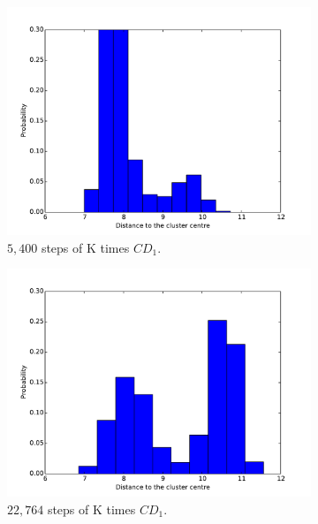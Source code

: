 \begin{figure}[hbt]
\begin{subfigure}[t]{0.18\textwidth}
			\includegraphics[width=\textwidth]{pics_sdbn/kcd_900.pdf}
		    \caption{$5,400$ steps of K times $CD_1$.}
		\end{subfigure}
		\begin{subfigure}[t]{0.18\textwidth}
			\includegraphics[width=\textwidth]{pics_sdbn/kcd_3794.pdf}
		    \caption{$ 22,764 $ steps of K times $CD_1$.}
		\end{subfigure}
		\begin{subfigure}[t]{0.18\textwidth}

\end{subfigure}
\end{figure}

